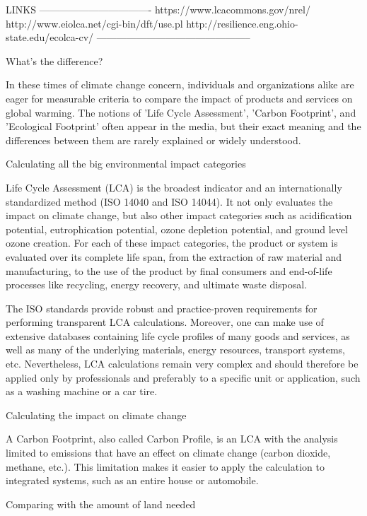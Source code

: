 LINKS
----------------------------------
https://www.lcacommons.gov/nrel/
http://www.eiolca.net/cgi-bin/dft/use.pl
http://resilience.eng.ohio-state.edu/ecolca-cv/
-----------------------------------------------


What’s the difference?

In these times of climate change concern, individuals and organizations alike are eager for measurable criteria to compare the impact of products and services on global warming. The notions of 'Life Cycle Assessment', 'Carbon Footprint', and 'Ecological Footprint' often appear in the media, but their exact meaning and the differences between them are rarely explained or widely understood.

Calculating all the big environmental impact categories

Life Cycle Assessment (LCA) is the broadest indicator and an internationally standardized method (ISO 14040 and ISO 14044). It not only evaluates the impact on climate change, but also other impact categories such as acidification potential, eutrophication potential, ozone depletion potential, and ground level ozone creation. For each of these impact categories, the product or system is evaluated over its complete life span, from the extraction of raw material and manufacturing, to the use of the product by final consumers and end-of-life processes like recycling, energy recovery, and ultimate waste disposal.

The ISO standards provide robust and practice-proven requirements for performing transparent LCA calculations. Moreover, one can make use of extensive databases containing life cycle profiles of many goods and services, as well as many of the underlying materials, energy resources, transport systems, etc. Nevertheless, LCA calculations remain very complex and should therefore be applied only by professionals and preferably to a specific unit or application, such as a washing machine or a car tire.

Calculating the impact on climate change

A Carbon Footprint, also called Carbon Profile, is an LCA with the analysis limited to emissions that have an effect on climate change (carbon dioxide, methane, etc.). This limitation makes it easier to apply the calculation to integrated systems, such as an entire house or automobile.

Comparing with the amount of land needed

